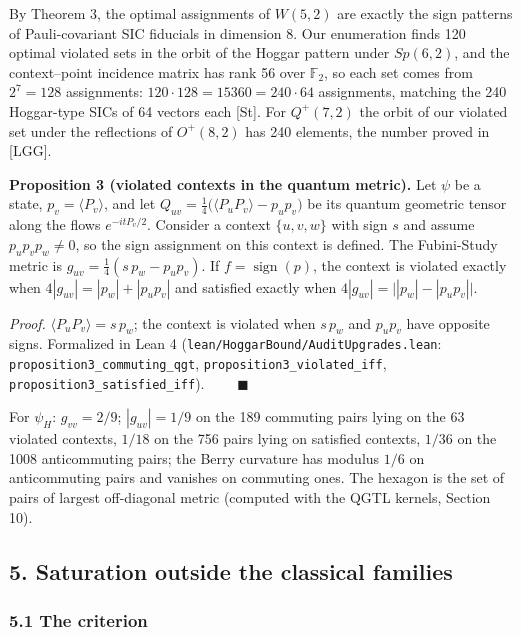 \documentclass[11pt,a4paper]{article}
\begin{document}
By Theorem 3, the optimal assignments of \(W(5,2)\) are exactly the sign patterns of Pauli-covariant SIC
fiducials in dimension 8. Our enumeration finds 120 optimal violated sets in the orbit of the Hoggar
pattern under \(Sp(6,2)\), and the context--point incidence matrix has rank 56 over \(\mathbb{F}_2\), so each
set comes from \(2^7 = 128\) assignments: \(120 \cdot 128 = 15360 = 240 \cdot 64\) assignments, matching the
240 Hoggar-type SICs of 64 vectors each {[}St{]}. For \(Q^+(7,2)\) the orbit of our violated set under the
reflections of \(O^+(8,2)\) has 240 elements, the number proved in {[}LGG{]}.

\textbf{Proposition 3 (violated contexts in the quantum metric).} Let \(\psi\) be a state, \(p_v = \langle P_v\rangle\),
and let \(Q_{uv} = \tfrac14\big(\langle P_u P_v\rangle - p_u p_v\big)\) be its quantum geometric tensor along
the flows \(e^{-itP_v/2}\). Consider a context \(\{u, v, w\}\) with sign \(s\) and assume
\(p_u p_v p_w\ne0\), so the sign assignment on this context is defined. The Fubini-Study metric is
\(g_{uv} = \tfrac14 (s\,p_w - p_u p_v)\). If \(f = \operatorname{sign}(p)\), the context is violated exactly when
\(4|g_{uv}| = |p_w| + |p_u p_v|\) and satisfied exactly when \(4|g_{uv}| = \big||p_w| - |p_u p_v|\big|\).

\emph{Proof.} \(\langle P_uP_v\rangle = s\,p_w\); the context is violated when \(s\,p_w\) and \(p_u p_v\) have opposite
signs. Formalized in Lean 4 (\nolinkurl{lean/HoggarBound/AuditUpgrades.lean}: \nolinkurl{proposition3_commuting_qgt},
\nolinkurl{proposition3_violated_iff}, \nolinkurl{proposition3_satisfied_iff}). \(\qquad\blacksquare\)

For \(\psi_H\): \(g_{vv} = 2/9\); \(|g_{uv}| = 1/9\) on the 189 commuting pairs lying on the 63 violated contexts,
\(1/18\) on the 756 pairs lying on satisfied contexts, \(1/36\) on the 1008 anticommuting pairs; the Berry
curvature has modulus \(1/6\) on anticommuting pairs and vanishes on commuting ones. The hexagon is the
set of pairs of largest off-diagonal metric (computed with the QGTL kernels, Section 10).

\subsection{5. Saturation outside the classical families}\label{5-saturation-outside-the-classical-families}

\subsubsection{5.1 The criterion}\label{51-the-criterion}
\end{document}
